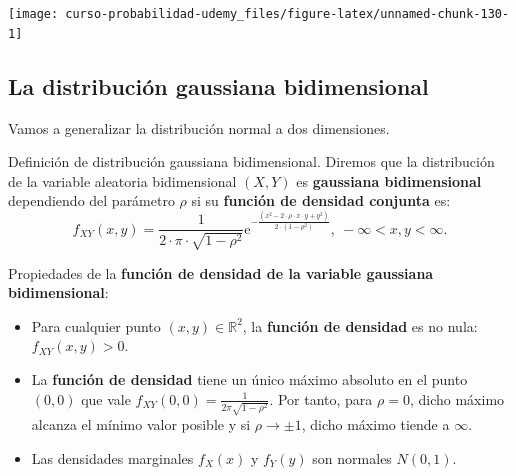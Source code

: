 \documentclass[]{book}
\begin{document}
\begin{center}\texttt{[image: curso-probabilidad-udemy\_files/figure-latex/unnamed-chunk-130-1]} \end{center}

\hypertarget{la-distribuciuxf3n-gaussiana-bidimensional}{%
\subsection{La distribución gaussiana bidimensional}\label{la-distribuciuxf3n-gaussiana-bidimensional}}

Vamos a generalizar la distribución normal a dos dimensiones.

Definición de distribución gaussiana bidimensional.
Diremos que la distribución de la variable aleatoria bidimensional \((X,Y)\) es \textbf{gaussiana bidimensional} dependiendo del parámetro \(\rho\) si su \textbf{función de densidad conjunta} es:
\[
f_{XY}(x,y)=\frac{1}{2\cdot\pi\cdot\sqrt{1-\rho^2}}\mathrm{e}^{-\frac{(x^2-2\cdot\rho\cdot x\cdot y+y^2)}{2\cdot(1-\rho^2)}},\ -\infty <x,y<\infty.
\]

Propiedades de la \textbf{función de densidad de la variable gaussiana bidimensional}:

\begin{itemize}
\item
  Para cualquier punto \((x,y)\in\mathbb{R}^2\), la \textbf{función de densidad} es no nula: \(f_{XY}(x,y)>0\).
\item
  La \textbf{función de densidad} tiene un único máximo absoluto en el punto \((0,0)\) que vale \(f_{XY}(0,0)=\frac{1}{2\pi\sqrt{1-\rho^2}}.\) Por tanto, para \(\rho=0\), dicho máximo alcanza el mínimo valor posible y si \(\rho\to \pm 1\), dicho máximo tiende a \(\infty\).
\item
  Las densidades marginales \(f_X(x)\) y \(f_Y(y)\) son normales \(N(0,1)\).
\end{itemize}
\end{document}
